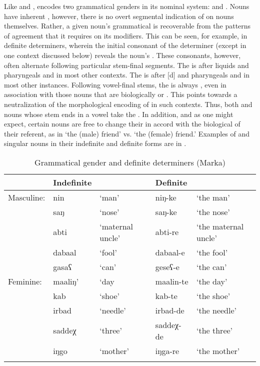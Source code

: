 \documentclass[output=paper,modfonts,nonflat,
hidelinks
]{langsci/langscibook}
\begin{document}
 Like  and ,  encodes two grammatical genders in its nominal system:  and . Nouns have inherent , however, there is no overt segmental indication of  on nouns themselves. Rather, a given noun's grammatical  is recoverable from the patterns of agreement that it requires on its modifiers. This can be seen, for example, in definite determiners, wherein the initial consonant of the determiner (except in one context discussed below) reveals the noun's . These consonants, however, often alternate following particular stem-final segments. The   is  after liquids and pharyngeals and  in most other contexts. The   is  after [d] and pharyngeals and  in most other instances. Following vowel-final stems, the  is always , even in association with those nouns that are biologically  or . This points towards a neutralization of the morphological encoding of  in such contexts. Thus, both  and  nouns whose stem ends in a vowel take the  . In addition, and as one might expect, certain nouns are free to change their  in accord with the biological  of their referent, as in  `the (male) friend' vs.  `the (female) friend.' Examples of   and  singular nouns in their indefinite and definite forms are in .
 


\begin{table}
 	\caption{{Grammatical gender and definite determiners (Marka)}}
 	\label{tab:1:Grammatical Gender}
 	\begin{tabularx}{\textwidth}{Xllll} 
 		\lsptoprule
 		 & Indefinite  &  & Definite &  \\ 
 		\midrule
 		Masculine: & nin & `man' & niŋ-ke & `the man' \\
 		 & saŋ  &   `nose' & saŋ-ke & `the nose' \\
 		 & abti & `maternal uncle' & abti-re & `the maternal uncle'  \\
 		 & dabaal & `fool' & dabaal-e & `the fool' \\
 		  & gasaʕ & `can' & geseʕ-e & `the can'\\
 		\tablevspace
 		Feminine: & maaliŋ' & `day & maalin-te & `the day' \\
 		 & kab & `shoe' & kab-te & `the shoe' \\
 		 & irbad & `needle' & irbad-de & `the needle' \\
 		  & saddeχ & `three' & saddeχ-de & `the three' \\
	 	& iŋgo & `mother' & iŋga-re & `the mother' \\
 		\lspbottomrule
 	\end{tabularx}
 \end{table}
 
\end{document}
